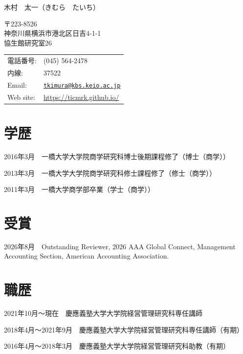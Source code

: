 \documentclass[letterpaper,11pt]{article}
\def\name{木村　太一}
\renewenvironment{itemize}{
  \begin{list}{}{
    \setlength{\leftmargin}{1.5em}
  }
}{
  \end{list}
}
\begin{document}
{\LARGE \name {\normalsize （きむら　たいち）}}

\vspace{0.25in}

\begin{minipage}{0.45\linewidth}
  〒223-8526 \\
  神奈川県横浜市港北区日吉4-1-1 \\
  協生館研究室26
\end{minipage}
\begin{minipage}{0.45\linewidth}
  \begin{tabular}{ll}
    電話番号: & (045) 564-2478 \\
    内線: & 37522\\
    Email: & \href{mailto:tkimura@kbs.keio.ac.jp}{\tt tkimura@kbs.keio.ac.jp}\\
    Web site: & \url{https://ticmrk.github.io/}
  \end{tabular}
\end{minipage}

\section*{学歴}

\begin{itemize}
  \item 2016年3月　一橋大学大学院商学研究科博士後期課程修了（博士（商学））
  \item 2013年3月　一橋大学大学院商学研究科修士課程修了（修士（商学））
  \item 2011年3月　一橋大学商学部卒業（学士（商学））
\end{itemize}

\section*{受賞}

\begin{itemize}
  \item 2026年8月　Outstanding Reviewer, 2026 AAA Global Connect, Management Accounting Section, American Accounting Association.
\end{itemize}

\section*{職歴}

\begin{itemize}
     \item 2021年10月〜現在　慶應義塾大学大学院経営管理研究科専任講師
     \item 2018年4月〜2021年9月　慶應義塾大学大学院経営管理研究科専任講師（有期）
     \item 2016年4月〜2018年3月　慶應義塾大学大学院経営管理研究科助教（有期）
\end{itemize}
\end{document}
